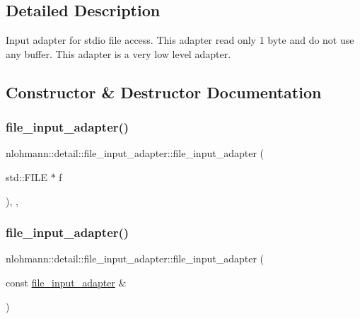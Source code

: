 \subsection{Detailed Description}
Input adapter for stdio file access. This adapter read only 1 byte and do not use any buffer. This adapter is a very low level adapter. 

\subsection{Constructor \& Destructor Documentation}
\mbox{\label{classnlohmann_1_1detail_1_1file__input__adapter_aeade050f2793280503be93feff2ece5b}} 
\subsubsection{\texorpdfstring{file\_input\_adapter()}{file\_input\_adapter()}\hspace{0.1cm}{\footnotesize\ttfamily [1/3]}}
{\footnotesize\ttfamily nlohmann\+::detail\+::file\+\_\+input\+\_\+adapter\+::file\+\_\+input\+\_\+adapter (\begin{DoxyParamCaption}\item[{std\+::\+F\+I\+LE $\ast$}]{f }\end{DoxyParamCaption})\hspace{0.3cm}{\ttfamily [inline]}, {\ttfamily [explicit]}, {\ttfamily [noexcept]}}

\mbox{\label{classnlohmann_1_1detail_1_1file__input__adapter_a308099b496a0cba2123a06fe99a95d02}} 
\subsubsection{\texorpdfstring{file\_input\_adapter()}{file\_input\_adapter()}\hspace{0.1cm}{\footnotesize\ttfamily [2/3]}}
{\footnotesize\ttfamily nlohmann\+::detail\+::file\+\_\+input\+\_\+adapter\+::file\+\_\+input\+\_\+adapter (\begin{DoxyParamCaption}\item[{const \mbox{\hyperlink{classnlohmann_1_1detail_1_1file__input__adapter}{file\+\_\+input\+\_\+adapter}} \&}]{ }\end{DoxyParamCaption})\hspace{0.3cm}{\ttfamily [delete]}}

